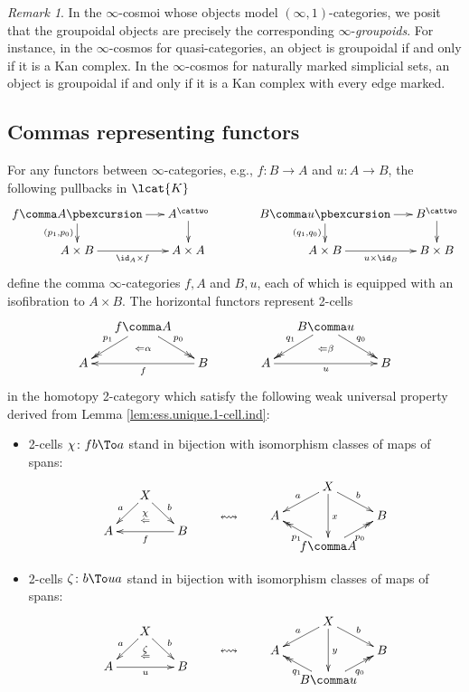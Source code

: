 \documentclass[12pt,reqno]{amsart}
\theoremstyle{plain}
\theoremstyle{definition}
\theoremstyle{remark}
\newtheorem{rmk}[thm]{Remark}
\numberwithin{equation}{subsection}
\begin{document}
\begin{rmk}
In the $\infty$-cosmoi whose objects model $(\infty,1)$-categories, we posit that the groupoidal objects are precisely the corresponding $\infty$-\emph{groupoids}. For instance, in the $\infty$-cosmos for quasi-categories, an object is groupoidal if and only if it is a Kan complex. In the $\infty$-cosmos for naturally marked simplicial sets, an object is groupoidal if and only if it is a Kan complex with every edge marked.
\end{rmk}


\subsection{Commas representing functors}

For any functors between $\infty$-categories, e.g., $f \colon B \to A$ and $u \colon A \to B$, the following pullbacks in $\lcat{K}$
\[ \xymatrix@=1.5em{ f \comma A \ar[d]_{(p_1,p_0)} \ar[r] \pbexcursion &  A^\cattwo \ar[d]  & & B \comma u \ar[d]_{(q_1,q_0)} \ar[r] \pbexcursion &  B^\cattwo \ar[d] \\ A \times B \ar[r]_{\id_A \times f} & A \times A & & A \times B \ar[r]_{u \times \id_B} & B \times B}\]
define the comma $\infty$-categories $f \comma A$ and $B \comma u$, each of which is equipped with an isofibration to $A \times B$. The horizontal functors represent 2-cells
\begin{equation}\label{eq:adj-comma-cone}
\xymatrix@=15pt{ & f \comma A \ar@{->>}[dl]_{p_1} \ar@{->>}[dr]^{p_0} \ar@{}[d]|(.6){\Leftarrow\alpha} & && & B \comma u \ar@{->>}[dl]_{q_1} \ar@{->>}[dr]^{q_0} \ar@{}[d]|(.6){\Leftarrow\beta} \\ A & & B \ar[ll]^f && A \ar[rr]_u & & B}
\end{equation}
in the homotopy 2-category which satisfy the following weak universal property derived from Lemma \ref{lem:ess.unique.1-cell.ind}:
\begin{itemize}
\item 2-cells $ \chi \colon fb \To a$ stand in bijection with isomorphism classes of maps of spans:
\[\vcenter{\xymatrix@=15pt{
      & X \ar[dl]_{a} \ar[dr]^{b} \ar@{}[d]|{\chi}|(.7){\Leftarrow}  \\ 
     A & & B \ar[ll]^f }} \qquad \leftrightsquigarrow \qquad     \vcenter{\xymatrix@=10pt{ & X \ar@{->}[dd]^{x} \ar[dr]^b \ar[dl]_a \\ A & & B \\ & f \comma A \ar@{->>}[ul]^{p_1} \ar@{->>}[ur]_{p_0}}}\]
\item 2-cells $\zeta \colon b \To ua$ stand in bijection with isomorphism classes of maps of spans:
\[\vcenter{\xymatrix@=15pt{
      & X \ar[dl]_{a} \ar[dr]^{b} \ar@{}[d]|{\zeta}|(.7){\Leftarrow}  \\ 
     A \ar[rr]_u & & B }}\qquad \leftrightsquigarrow \qquad   \vcenter{\xymatrix@=10pt{ & X \ar@{->}[dd]^{y} \ar[dr]^b \ar[dl]_a \\ A & & B \\ & B \comma u \ar@{->>}[ul]^{q_1} \ar@{->>}[ur]_{q_0}}}\]

\end{itemize}
\end{document}
